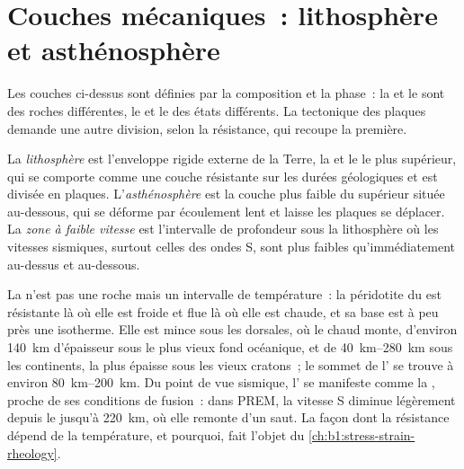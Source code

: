 \section{Couches mécaniques~: lithosphère et asthénosphère}

Les couches ci-dessus sont définies par la composition et la phase~: la  et
le  sont des roches différentes, le  et le  des
états différents. La tectonique des plaques demande une autre division, selon la
résistance, qui recoupe la première.

\begin{definition}
\label{def:b1:layered-earth:lithosphere}
La \emph{lithosphère} est l'enveloppe rigide externe de la
Terre, la  et le  le plus supérieur, qui se comporte comme une couche
résistante sur les durées géologiques et est divisée en plaques.
L'\emph{asthénosphère} est la couche plus faible du  supérieur située
au-dessous, qui se déforme par écoulement lent et laisse les plaques se déplacer.
La \emph{zone à faible vitesse} est l'intervalle de profondeur sous la lithosphère où
les vitesses sismiques, surtout celles des ondes S, sont plus faibles
qu'immédiatement au-dessus et au-dessous.
\end{definition}

La  n'est pas une roche mais un intervalle de température~: la
péridotite du  est résistante là où elle est froide et flue là où elle est
chaude, et sa base est à peu près une isotherme. Elle est mince sous les dorsales,
où le  chaud monte, d'environ \qty{140}{km} d'épaisseur sous le plus vieux
fond océanique, et de \qtyrange{40}{280}{km} sous les continents, la plus épaisse
sous les vieux cratons~; le sommet de l' se trouve à environ
\qtyrange{80}{200}{km}. Du point de vue sismique, l' se manifeste
comme la , proche de ses conditions de fusion~: dans PREM, la
vitesse S diminue légèrement depuis le  jusqu'à \qty{220}{km}, où elle remonte
d'un saut. La façon dont la résistance dépend de la température, et pourquoi, fait
l'objet du \cref{ch:b1:stress-strain-rheology}.


